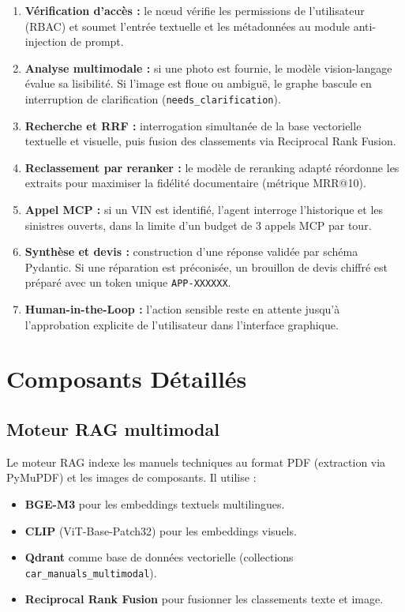 \documentclass[11pt,a4paper]{article}
\begin{document}
\begin{enumerate}[leftmargin=*]
  \item \textbf{Vérification d'accès :} le nœud vérifie les permissions de l'utilisateur (RBAC) et soumet l'entrée textuelle et les métadonnées au module anti-injection de prompt.
  \item \textbf{Analyse multimodale :} si une photo est fournie, le modèle vision-langage évalue sa lisibilité. Si l'image est floue ou ambiguë, le graphe bascule en interruption de clarification (\texttt{needs\_clarification}).
  \item \textbf{Recherche et RRF :} interrogation simultanée de la base vectorielle textuelle et visuelle, puis fusion des classements via Reciprocal Rank Fusion.
  \item \textbf{Reclassement par reranker :} le modèle de reranking adapté réordonne les extraits pour maximiser la fidélité documentaire (métrique MRR@10).
  \item \textbf{Appel MCP :} si un VIN est identifié, l'agent interroge l'historique et les sinistres ouverts, dans la limite d'un budget de 3 appels MCP par tour.
  \item \textbf{Synthèse et devis :} construction d'une réponse validée par schéma Pydantic. Si une réparation est préconisée, un brouillon de devis chiffré est préparé avec un token unique \texttt{APP-XXXXXX}.
  \item \textbf{Human-in-the-Loop :} l'action sensible reste en attente jusqu'à l'approbation explicite de l'utilisateur dans l'interface graphique.
\end{enumerate}

\section{Composants Détaillés}

\subsection{Moteur RAG multimodal}
Le moteur RAG indexe les manuels techniques au format PDF (extraction via PyMuPDF) et les images de composants. Il utilise :
\begin{itemize}[leftmargin=*]
  \item \textbf{BGE-M3} pour les embeddings textuels multilingues.
  \item \textbf{CLIP} (ViT-Base-Patch32) pour les embeddings visuels.
  \item \textbf{Qdrant} comme base de données vectorielle (collections \texttt{car\_manuals\_multimodal}).
  \item \textbf{Reciprocal Rank Fusion} pour fusionner les classements texte et image.
\end{itemize}
\end{document}
